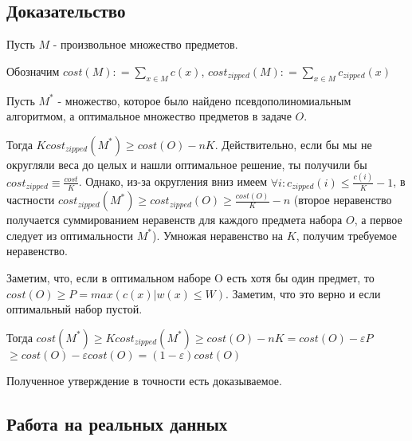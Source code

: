\documentclass{article}
\begin{document}
	\subsection{Доказательство}
	
	Пусть $M$ - произвольное множество предметов.
	
	Обозначим $cost(M) : = \sum\limits_{x \in M} c(x)$,  $cost_{zipped}(M) : = \sum\limits_{x \in M} c_{zipped}(x)$
	
	Пусть $M^*$ - множество, которое было найдено псевдополиномиальным алгоритмом, а оптимальное множество предметов в задаче $O$.
	
	Тогда $K cost_{zipped}(M^*) \geq cost(O) -  nK$. Действительно, если бы мы не округляли веса до целых и нашли оптимальное решение, ты получили бы $ cost_{zipped} \equiv \frac{cost}{K}$. Однако, из-за округления вниз имеем  $\forall i: c_{zipped}(i) \leq \frac{c(i)}{K} - 1$, в частности $cost_{zipped}(M^*) \geq cost_{zipped}(O) \geq \frac{cost(O)}{K} - n$ (второе неравенство получается суммированием неравенств для каждого предмета набора $O$, а первое следует из оптимальности $M^*$). Умножая неравенство на $K$, получим требуемое неравенство.
	
	Заметим, что, если в оптимальном наборе O есть хотя бы один предмет, то 
	$cost(O) \geq P = max(c(x) | w(x) \leq W)$. Заметим, что это верно и если оптимальный набор пустой.
	
	Тогда $cost(M^*) \geq $$ K cost_{zipped} (M^*) \geq $$ cost(O) -  nK $$= cost(O) - \varepsilon P $$ \geq cost(O) - \varepsilon cost(O) $$ = (1 - \varepsilon) cost(O)$
	
	Полученное утверждение в точности есть доказываемое.
	
	
	
	
	
	\subsection{Работа на реальных данных}
	
\end{document}
